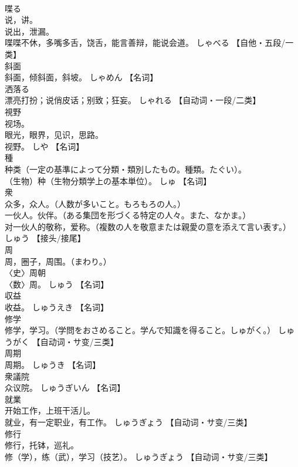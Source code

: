 \documentclass[8pt]{extreport}
\begin{document}
\begin{CJK}{UTF8}{min}
\\	喋る	
\\	说，讲。 
\\	说出，泄漏。 
\\	喋喋不休，多嘴多舌，饶舌，能言善辩，能说会道。	しゃべる		【自他・五段/一类】
\\	斜面	
\\	斜面，倾斜面，斜坡。	しゃめん		【名词】
\\	洒落る	
\\	漂亮打扮；说俏皮话；别致；狂妄。	しゃれる		【自动词・一段/二类】
\\	視野	
\\	视场。 
\\	眼光，眼界，见识，思路。 
\\	视野。	しや		【名词】
\\	種	
\\	种类（一定の基準によって分類・類別したもの。種類。たぐい）。 
\\	（生物）种（生物分類学上の基本単位）。	しゅ		【名词】
\\	衆	
\\	众多，众人。（人数が多いこと。もろもろの人。） 
\\	一伙人。伙伴。（ある集団を形づくる特定の人々。また、なかま。） 
\\	对一伙人的敬称，爱称。（複数の人を敬意または親愛の意を添えて言い表す。）	しゅう		【接头/接尾】
\\	周	
\\	周，圈子，周围。（まわり。） 
\\	〈史〉周朝
\\	〈数〉周。	しゅう		【名词】
\\	収益	
\\	收益。	しゅうえき		【名词】
\\	修学	
\\	修学，学习。（学問をおさめること。学んで知識を得ること。しゅがく。）	しゅうがく		【自动词・サ变/三类】
\\	周期	
\\	周期。	しゅうき		【名词】
\\	衆議院	
\\	众议院。	しゅうぎいん		【名词】
\\	就業	
\\	开始工作，上班干活儿。 
\\	就业，有一定职业，有工作。	しゅうぎょう		【自动词・サ变/三类】
\\	修行	
\\	修行，托钵，巡礼。 
\\	修（学），练（武），学习（技艺）。	しゅうぎょう		【自动词・サ变/三类】

\end{CJK}
\end{document}
